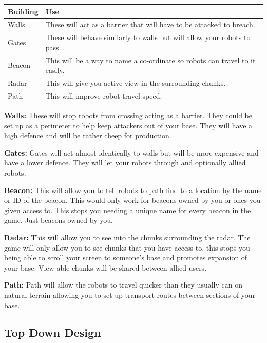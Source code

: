 \documentclass[12pt]{article}
\begin{document}
\begin{tabular}{l | l}
Building & Use \\
\hline
Walls & These will act as a barrier that will have to be attacked to breach. \\
Gates & These will behave similarly to walls but will allow your robots to pass. \\
Beacon & This will be a way to name a co-ordinate so robots can travel to it easily. \\
Radar & This will give you active view in the surrounding chunks. \\
Path & This will improve robot travel speed. \\
\end{tabular}

\textbf{Walls:} These will stop robots from crossing acting as a barrier. They could be set up as a perimeter to help keep attackers out of your base. They will have a high defence and will be rather cheep for production. 

\textbf{Gates:} Gates will act almost identically to walls but will be more expensive and have a lower defence. They will let your robots through and optionally allied robots.

\textbf{Beacon:} This will allow you to tell robots to path find to a location by the name or ID of the beacon. This would only work for beacons owned by you or ones you given access to. This stops you needing a unique name for every beacon in the game. Just beacons owned by you.

\textbf{Radar:} This will allow you to see into the chunks surrounding the radar. The game will only allow you to see chunks that you have access to, this stops you being able to scroll your screen to someone's base and promotes expansion of your base. View able chunks will be shared between allied users.

\textbf{Path:} Path will allow the robots to travel quicker than they usually can on natural terrain allowing you to set up transport routes between sections of your base.


\newpage\subsection{Top Down Design}
\end{document}
